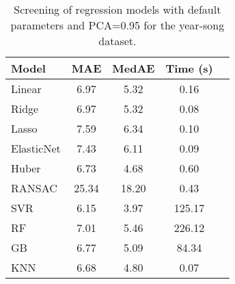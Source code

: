 \begin{table}
    \centering
    \caption{Screening of regression models with default parameters and PCA=0.95 for the year-song dataset.}
    \label{tab:year_song_screening}
    \begin{tabular}{|l|c|c|c|c|}
    \toprule
    Model & MAE & MedAE & Time (s) \\
    \midrule
    Linear  & 6.97 & 5.32 & 0.16 \\
    Ridge  & 6.97 & 5.32 & 0.08 \\
    Lasso  & 7.59 & 6.34 & 0.10 \\
    ElasticNet  & 7.43 & 6.11 & 0.09 \\
    Huber  & 6.73 & 4.68 & 0.60 \\
    RANSAC  & 25.34 & 18.20 & 0.43 \\
    SVR  & 6.15 & 3.97 & 125.17 \\
    RF  & 7.01 & 5.46 & 226.12 \\
    GB  & 6.77 & 5.09 & 84.34 \\
    KNN  & 6.68 & 4.80 & 0.07 \\
    \bottomrule
    \end{tabular}
\end{table}